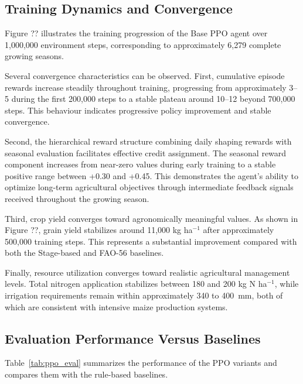 \subsection{Training Dynamics and Convergence}

Figure ?? illustrates the training progression of the Base PPO agent over 1,000,000 environment steps, corresponding to approximately 6,279 complete growing seasons.

Several convergence characteristics can be observed. First, cumulative episode rewards increase steadily throughout training, progressing from approximately 3--5 during the first 200,000 steps to a stable plateau around 10--12 beyond 700,000 steps. This behaviour indicates progressive policy improvement and stable convergence.

Second, the hierarchical reward structure combining daily shaping rewards with seasonal evaluation facilitates effective credit assignment. The seasonal reward component increases from near-zero values during early training to a stable positive range between +0.30 and +0.45. This demonstrates the agent's ability to optimize long-term agricultural objectives through intermediate feedback signals received throughout the growing season.

Third, crop yield converges toward agronomically meaningful values. As shown in Figure ??, grain yield stabilizes around 11,000 kg ha$^{-1}$ after approximately 500,000 training steps. This represents a substantial improvement compared with both the Stage-based and FAO-56 baselines.

Finally, resource utilization converges toward realistic agricultural management levels. Total nitrogen application stabilizes between 180 and 200 kg N ha$^{-1}$, while irrigation requirements remain within approximately 340 to 400~mm, both of which are consistent with intensive maize production systems.


\subsection{Evaluation Performance Versus Baselines}

Table~\ref{tab:ppo_eval} summarizes the performance of the PPO variants and compares them with the rule-based baselines.

